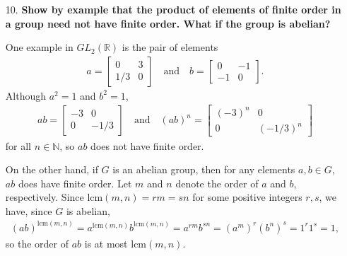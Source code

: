 \documentclass[a4paper,12pt]{article}
\begin{document}
\begin{enumerate}
    \item[10.]
        \boldmath
        \textbf{Show by example that the product of elements of finite order in a group need not have finite order. What if the group is abelian?} \par
        \unboldmath
        One example in $GL_2(\mathbb{R})$ is the pair of elements
        \begin{align*}
            a = \left[ \begin{array}{cc}
                    0 & 3 \\
                    1/3 & 0
            \end{array} \right]
            \quad \text{and} \quad
            b = \left[ \begin{array}{cc}
                    0 & -1 \\
                    -1 & 0
            \end{array} \right].
        \end{align*}
        Although $a^2 = 1$ and $b^2 = 1$,
        \begin{align*}
            ab = \left[ \begin{array}{cc}
                    -3 & 0 \\
                    0 & -1/3
            \end{array} \right]
            \quad \text{and} \quad
            (ab)^n = \left[ \begin{array}{cc}
                    (-3)^n & 0 \\
                    0 & (-1/3)^n
            \end{array} \right]
        \end{align*}
        for all $n \in \mathbb{N}$, so $ab$ does not have finite order. \par
        On the other hand, if $G$ is an abelian group, then for any elements $a, b \in G$, $ab$ does have finite order. Let $m$ and $n$ denote the order of $a$ and $b$, respectively. Since $\text{lcm}(m, n) = rm = sn$ for some positive integers $r, s$, we have, since $G$ is abelian,
        \begin{align*}
            (ab)^{\text{lcm}(m, n)} = a^{\text{lcm}(m, n)} b^{\text{lcm}(m, n)} = a^{rm} b^{sn} = \left( a^m \right)^r \left( b^n \right)^s = 1^r 1^s = 1,
        \end{align*}
        so the order of $ab$ is at most $\text{lcm}(m, n)$.
\end{enumerate}
\end{document}
